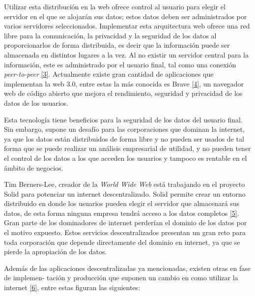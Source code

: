 \documentclass[12pt,spanish,Letterpaper,openany]{book}
\begin{document}
Utilizar esta distribución en la web ofrece control al usuario para elegir el servidor en el que se alojarán sus datos; estos datos deben ser administrados por varios servidores seleccionados. Implementar esta arquitectura web ofrece una red libre para la comunicación, la privacidad y la seguridad de los datos al proporcionarlos de forma distribuida, es decir que la información puede ser almacenada en distintos lugares a la vez. Al no existir un servidor central para la información, este es administrado por el usuario final, tal como una conexión \emph{peer-to-peer} \protect\hyperlink{articulo11_ref03}{{[}3{]}}. Actualmente existe gran cantidad de aplicaciones que implementan la web 3.0, entre estas la más conocida es Brave \protect\hyperlink{articulo11_ref04}{{[}4{]}}, un navegador web de código abierto que mejora el rendimiento, seguridad y privacidad de los datos de los usuarios.

Esta tecnología tiene beneficios para la seguridad de los datos del usuario final. Sin embargo, supone un desafío para las corporaciones que dominan la internet, ya que los datos están distribuidos de forma libre y no pueden ser usados de tal forma que se puede realizar un análisis empresarial de utilidad, y no pueden tener el control de los datos a los que acceden los usuarios y tampoco es rentable en el ámbito de negocios.

Tim Berners-Lee, creador de la \emph{World Wide Web} está trabajando en el proyecto Solid para potenciar un internet descentralizado. Solid permite crear un entorno distribuido en donde los usuarios pueden elegir el servidor que almacenará sus datos, de esta forma ninguna empresa tendrá acceso a los datos completos \protect\hyperlink{articulo11_ref05}{{[}5{]}}. Gran parte de los dominadores de internet perderían el dominio de los datos por el motivo expuesto. Estos servicios descentralizados presentan un gran reto para toda corporación que depende directamente del dominio en internet, ya que se pierde la apropiación de los datos.

Además de las aplicaciones descentralizadas ya mencionadas, existen otras en fase de implemen-
tación y producción que suponen un cambio en como utilizar la internet \protect\hyperlink{articulo11_ref06}{{[}6{]}}, entre estas figuran las siguientes:
\end{document}
